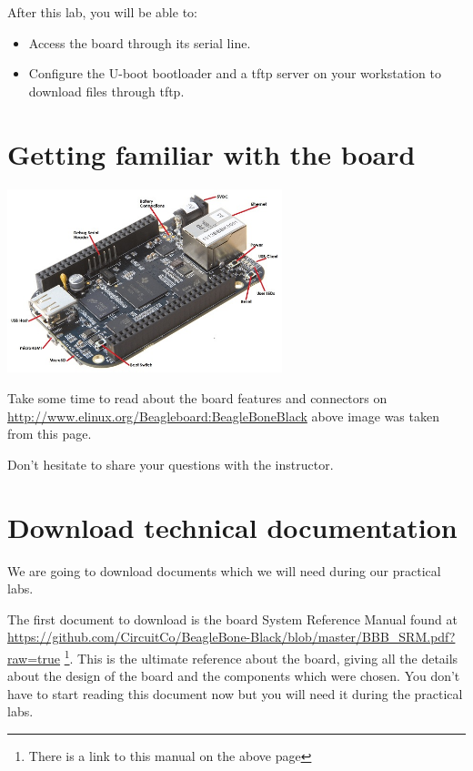 
After this lab, you will be able to:
\begin{itemize}
\item Access the board through its serial line.
\item Configure the U-boot bootloader and a tftp server
      on your workstation to download files through tftp.
\end{itemize}

\section{Getting familiar with the board}

\begin{center}
\includegraphics[width=8cm]{labs/kernel-board-setup/beaglebone-black-connectors.jpg}
\end{center}

Take some time to read about the board features and connectors on
\url{http://www.elinux.org/Beagleboard:BeagleBoneBlack}
above image was taken from this page.

Don't hesitate to share your questions with the instructor.

\section{Download technical documentation}

We are going to download documents which we will need during our
practical labs.

The first document to download is the board System Reference Manual found at
\url{https://github.com/CircuitCo/BeagleBone-Black/blob/master/BBB_SRM.pdf?raw=true}
\footnote{There is a link to this manual on the above page}.
This is the ultimate reference about the board, giving all the details
about the design of the board and the components which were chosen.
You don't have to start reading this document now but you will need it
during the practical labs.

